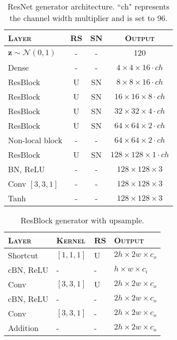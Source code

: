 \documentclass{article}
\begin{document}
\begin{table}[h]
\centering
\caption{\label{tab:resnet_g_blocks}ResNet generator architecture. ``ch" represents the channel width multiplier and is set to $96$.\vspace{0.2cm}}
\begin{tabular}{lccc}
\toprule
\textsc{Layer}               & \textsc{RS} & \textsc{SN} & \textsc{Output}               \\ \toprule
$\bm z\sim \mathcal{N}(0,1)$ & -           & -           & $120$                         \\ \midrule
Dense                        & -           & -           & $4\times4\times16\cdot ch$    \\
ResBlock                     & U           & SN          & $8\times8\times16\cdot ch$    \\
ResBlock                     & U           & SN          & $16\times16\times8\cdot ch$   \\
ResBlock                     & U           & SN          & $32\times32\times4\cdot ch$   \\
ResBlock                     & U           & SN          & $64\times64\times2\cdot ch$   \\
Non-local block              & -           & -           & $64\times64\times2\cdot ch$   \\
ResBlock                     & U           & SN          & $128\times128\times1\cdot ch$ \\
BN, ReLU                     & -           & -           & $128\times128\times3$         \\
Conv $[3, 3, 1]$             & -           & -           & $128\times128\times3$         \\
Tanh                         & -           & -           & $128\times128\times3$         \\ \bottomrule
\end{tabular}
\end{table}

\begin{table}[h]
 \centering
\caption{\label{tab:resblock_generator}ResBlock generator with upsample.\vspace{0.2cm}}
\begin{tabular}{llll}
  \toprule
      \textsc{Layer} & \textsc{Kernel}& \textsc{RS} & \textsc{Output} \\\toprule
      Shortcut & $[1,1,1]$ & U & $2h \times 2w \times c_{o}$ \\ \midrule
      cBN, ReLU & - & - & $h \times w \times c_{i}$ \\
      Conv & $[3,3,1]$ & U & $2h \times 2w \times c_{o}$ \\
      cBN, ReLU & - & - & $2h \times 2w \times c_{o}$ \\
      Conv & $[3,3,1]$ & - & $2h \times 2w \times c_{o}$ \\ \midrule
      Addition & - & - & $2h \times 2w \times c_{o}$ \\ \bottomrule
    \end{tabular}
\end{table}
\end{document}
